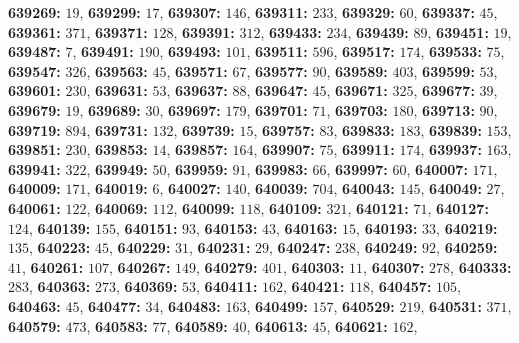 \textsf{\bfseries 639269:} $19$, \textsf{\bfseries 639299:} $17$, \textsf{\bfseries 639307:} $146$, \textsf{\bfseries 639311:} $233$, \textsf{\bfseries 639329:} $60$, \textsf{\bfseries 639337:} $45$, \textsf{\bfseries 639361:} $371$, \textsf{\bfseries 639371:} $128$, \textsf{\bfseries 639391:} $312$, \textsf{\bfseries 639433:} $234$, \textsf{\bfseries 639439:} $89$, \textsf{\bfseries 639451:} $19$, \textsf{\bfseries 639487:} $7$, \textsf{\bfseries 639491:} $190$, \textsf{\bfseries 639493:} $101$, \textsf{\bfseries 639511:} $596$, \textsf{\bfseries 639517:} $174$, \textsf{\bfseries 639533:} $75$, \textsf{\bfseries 639547:} $326$, \textsf{\bfseries 639563:} $45$, \textsf{\bfseries 639571:} $67$, \textsf{\bfseries 639577:} $90$, \textsf{\bfseries 639589:} $403$, \textsf{\bfseries 639599:} $53$, \textsf{\bfseries 639601:} $230$, \textsf{\bfseries 639631:} $53$, \textsf{\bfseries 639637:} $88$, \textsf{\bfseries 639647:} $45$, \textsf{\bfseries 639671:} $325$, \textsf{\bfseries 639677:} $39$, \textsf{\bfseries 639679:} $19$, \textsf{\bfseries 639689:} $30$, \textsf{\bfseries 639697:} $179$, \textsf{\bfseries 639701:} $71$, \textsf{\bfseries 639703:} $180$, \textsf{\bfseries 639713:} $90$, \textsf{\bfseries 639719:} $894$, \textsf{\bfseries 639731:} $132$, \textsf{\bfseries 639739:} $15$, \textsf{\bfseries 639757:} $83$, \textsf{\bfseries 639833:} $183$, \textsf{\bfseries 639839:} $153$, \textsf{\bfseries 639851:} $230$, \textsf{\bfseries 639853:} $14$, \textsf{\bfseries 639857:} $164$, \textsf{\bfseries 639907:} $75$, \textsf{\bfseries 639911:} $174$, \textsf{\bfseries 639937:} $163$, \textsf{\bfseries 639941:} $322$, \textsf{\bfseries 639949:} $50$, \textsf{\bfseries 639959:} $91$, \textsf{\bfseries 639983:} $66$, \textsf{\bfseries 639997:} $60$, \textsf{\bfseries 640007:} $171$, \textsf{\bfseries 640009:} $171$, \textsf{\bfseries 640019:} $6$, \textsf{\bfseries 640027:} $140$, \textsf{\bfseries 640039:} $704$, \textsf{\bfseries 640043:} $145$, \textsf{\bfseries 640049:} $27$, \textsf{\bfseries 640061:} $122$, \textsf{\bfseries 640069:} $112$, \textsf{\bfseries 640099:} $118$, \textsf{\bfseries 640109:} $321$, \textsf{\bfseries 640121:} $71$, \textsf{\bfseries 640127:} $124$, \textsf{\bfseries 640139:} $155$, \textsf{\bfseries 640151:} $93$, \textsf{\bfseries 640153:} $43$, \textsf{\bfseries 640163:} $15$, \textsf{\bfseries 640193:} $33$, \textsf{\bfseries 640219:} $135$, \textsf{\bfseries 640223:} $45$, \textsf{\bfseries 640229:} $31$, \textsf{\bfseries 640231:} $29$, \textsf{\bfseries 640247:} $238$, \textsf{\bfseries 640249:} $92$, \textsf{\bfseries 640259:} $41$, \textsf{\bfseries 640261:} $107$, \textsf{\bfseries 640267:} $149$, \textsf{\bfseries 640279:} $401$, \textsf{\bfseries 640303:} $11$, \textsf{\bfseries 640307:} $278$, \textsf{\bfseries 640333:} $283$, \textsf{\bfseries 640363:} $273$, \textsf{\bfseries 640369:} $53$, \textsf{\bfseries 640411:} $162$, \textsf{\bfseries 640421:} $118$, \textsf{\bfseries 640457:} $105$, \textsf{\bfseries 640463:} $45$, \textsf{\bfseries 640477:} $34$, \textsf{\bfseries 640483:} $163$, \textsf{\bfseries 640499:} $157$, \textsf{\bfseries 640529:} $219$, \textsf{\bfseries 640531:} $371$, \textsf{\bfseries 640579:} $473$, \textsf{\bfseries 640583:} $77$, \textsf{\bfseries 640589:} $40$, \textsf{\bfseries 640613:} $45$, \textsf{\bfseries 640621:} $162$, 
